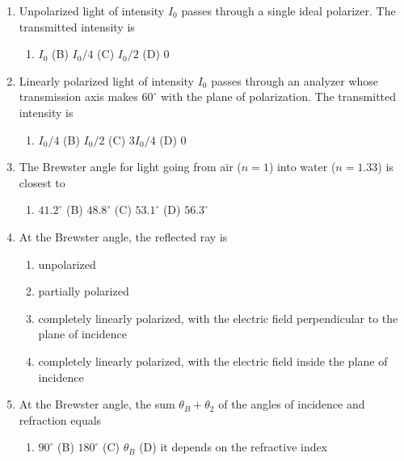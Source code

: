 ﻿\documentclass[11pt]{ctexart}
\begin{document}
\small
\begin{enumerate}[label=\textbf{Q\arabic*.},leftmargin=2.5em,itemsep=2pt,topsep=2pt]
\item Unpolarized light of intensity $I_0$ passes through a single ideal polarizer.
The transmitted intensity is
\begin{enumerate}[label=(\Alph*),leftmargin=2.4em,itemsep=0pt,topsep=1pt,parsep=0pt]
\item $I_0$ \qquad (B) $I_0/4$ \qquad (C) $I_0/2$ \qquad (D) $0$
\end{enumerate}

\item Linearly polarized light of intensity $I_0$ passes through an analyzer whose transmission
axis makes $60^\circ$ with the plane of polarization. The transmitted intensity is
\begin{enumerate}[label=(\Alph*),leftmargin=2.4em,itemsep=0pt,topsep=1pt,parsep=0pt]
\item $I_0/4$ \qquad (B) $I_0/2$ \qquad (C) $3I_0/4$ \qquad (D) $0$
\end{enumerate}

\item The Brewster angle for light going from air ($n=1$) into water ($n=1.33$) is closest to
\begin{enumerate}[label=(\Alph*),leftmargin=2.4em,itemsep=0pt,topsep=1pt,parsep=0pt]
\item $41.2^\circ$ \qquad (B) $48.8^\circ$ \qquad (C) $53.1^\circ$ \qquad (D) $56.3^\circ$
\end{enumerate}

\item At the Brewster angle, the reflected ray is
\begin{enumerate}[label=(\Alph*),leftmargin=2.4em,itemsep=0pt,topsep=1pt,parsep=0pt]
\item unpolarized
\item partially polarized
\item completely linearly polarized, with the electric field perpendicular to the plane of incidence
\item completely linearly polarized, with the electric field inside the plane of incidence
\end{enumerate}

\item At the Brewster angle, the sum $\theta_B+\theta_2$ of the angles of incidence and refraction equals
\begin{enumerate}[label=(\Alph*),leftmargin=2.4em,itemsep=0pt,topsep=1pt,parsep=0pt]
\item $90^\circ$ \qquad (B) $180^\circ$ \qquad (C) $\theta_B$ \qquad (D) it depends on the refractive index
\end{enumerate}


\end{enumerate}
\end{document}
